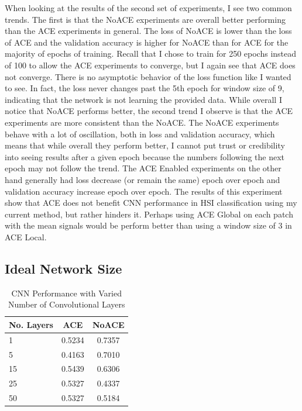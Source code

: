 \documentclass[12pt]{article}
\begin{document}
When looking at the results of the second set of experiments, I see two common trends.
%
The first is that the NoACE experiments are overall better performing than the ACE experiments in general.
%
The loss of NoACE is lower than the loss of ACE and the validation accuracy is higher for NoACE than for ACE for the majority of epochs of training.
%
Recall that I chose to train for 250 epochs instead of 100 to allow the ACE experiments to converge, but I again see that ACE does not converge.
%
There is no asymptotic behavior of the loss function like I wanted to see.
%
In fact, the loss never changes past the 5th epoch for window size of 9, indicating that the network is not learning the provided data.
%
While overall I notice that NoACE performs better, the second trend I observe is that the ACE experiments are more consistent than the NoACE.
%
The NoACE experiments behave with a lot of oscillation, both in loss and validation accuracy, which means that while overall they perform better, I cannot put trust or credibility into seeing results after a given epoch because the numbers following the next epoch may not follow the trend.
%
The ACE Enabled experiments on the other hand generally had loss decrease (or remain the same) epoch over epoch and validation accuracy increase epoch over epoch. 
%
The results of this experiment show that ACE does not benefit CNN performance in HSI classification using my current method, but rather hinders it.
%
Perhaps using ACE Global on each patch with the mean signals would be perform better than using a window size of 3 in ACE Local.

\subsection{Ideal Network Size}

\begin{table}[t]
	
	\centering
	
	\caption{CNN Performance with Varied Number of Convolutional Layers}
	\label{table:cnn}
	\begin{tabular}{l | c | c }
		\textbf{No. Layers} & \textbf{ACE} & \textbf{NoACE} \\			
		\hline	
		1 & 0.5234 & 0.7357 \\
		5 & 0.4163 & 0.7010 \\
		15 & 0.5439 & 0.6306 \\
		25 & 0.5327 & 0.4337 \\
		50 & 0.5327 & 0.5184 \\
		
	\end{tabular}	
	
\end{table}
\end{document}
